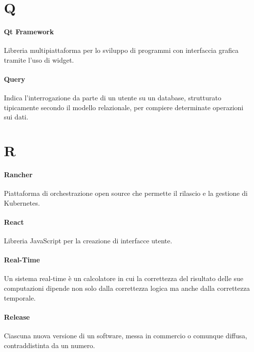 \documentclass[]{article}
\begin{document}
	\newpage
	
	\section*{Q}
	
	\paragraph*{Qt Framework}
	Libreria multipiattaforma per lo sviluppo di programmi con interfaccia grafica tramite l'uso di widget.
	
	\paragraph*{Query}
	Indica l'interrogazione da parte di un utente su un database, strutturato tipicamente secondo il modello relazionale, per compiere determinate operazioni sui dati.
	
	\newpage
	
	\section*{R}
	
	\paragraph*{Rancher}
	Piattaforma di orchestrazione open source che permette il rilascio e la gestione di Kubernetes.
	
	\paragraph*{React}
	Libreria JavaScript per la creazione di interfacce utente.
	
	\paragraph*{Real-Time}
	Un sistema real-time è un calcolatore in cui la correttezza del risultato delle sue computazioni dipende non solo dalla correttezza logica ma anche dalla correttezza temporale.
	
	\paragraph*{Release}
	Ciascuna nuova versione di un software, messa in commercio o comunque diffusa, contraddistinta da un numero.
	
\end{document}
